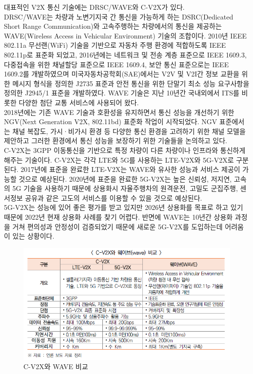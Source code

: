     대표적인 V2X 통신 기술에는 DRSC/WAVE와 C-V2X가 있다. \\
    DRSC/WAVE는 차량과 노변기지국 간 통신을 가능하게 하는 DSRC(Dedicated Short Range Communication)와 고속주행하는 차량에서의 통신을 제공하는 WAVE(Wireless Access in Vehicular Environment) 기술의 조합이다. 2010년 IEEE 802.11a 무선랜(WiFi) 기술을 기반으로 자동차 주행 환경에 적합하도록 IEEE 802.11p로 표준화 되었고, 2016년에는 네트워크 및 전송 계층 표준으로 IEEE 1609.3, 다중접속을 위한 채널할당 표준으로 IEEE 1609.4, 보안 통신 표준으로는 IEEE 1609.2를 개발하였으며 미국자동차공학회(SAE)에서는 V2V 및 V2I간 정보 교환을 위한 메시지 형식을 정의한 J2735 표준과 안전 통신을 위한 단말기 최소 성능 요구사항을 정의한 J2945/1 표준을 개발하였다. WAVE 기술은 지난 10년간 국내외에서 ITS를 비롯한 다양한 첨단 교통 서비스에 사용되어 왔다. \\
    2018년에는 기존 WAVE 기술과 호환성을 유지하면서 통신 성능을 개선하기 위한 NGV(Next Generation V2X, 802.11bd) 표준화 작업이 시작되었다. NGV 표준에서는 채널 복잡도, 가시·비가시 환경 등 다양한 통신 환경을 고려하기 위한 채널 모델을 제안하고 그러한 환경에서 통신 성능을 보장하기 위한 기술들을 논의하고 있다. \\
    C-V2X는 3GPP 이동통신을 기반으로 특정 차량이 다른 차량이나 인프라와 통신하게 해주는 기술이다. C-V2X는 각각 LTE와 5G를 사용하는 LTE-V2X와 5G-V2X로 구분된다. 2017년에 표준을 완료한 LTE-V2X는 WAVE와 유사한 성능과 서비스 제공이 가능할 것으로 예상된다. 2020년에 표준을 완료한 5G-V2X는 높은 신뢰성, 저지연, 고속의 5G 기술을 사용하기 때문에 상용화시 자율주행차의 원격운전, 고밀도 군집주행, 센서정보 공유과 같은 고도의 서비스를 이용할 수 있을 것으로 예상된다. \\
    5G-V2X는 성능에 있어 좋은 평가를 받고 있지만 2026년 상용화를 목표로 하고 있기 때문에 2022년 현재 상용화 사례를 찾기 어렵다. 반면에 WAVE는 10년간 상용화 과정을 거쳐 편의성과 안정성이 검증되었기 때문에 새로운 5G-V2X를 도입하는데 어려움이 있는 상황이다. \\
    \vspace{-4mm}
    \begin{figure}[!h]\centering
		\includegraphics[width=.85\textwidth]{image/week13/3-2.png}
		\caption{\small C-V2X와 WAVE 비교}
		\vspace{-10pt}
    \end{figure}
    
